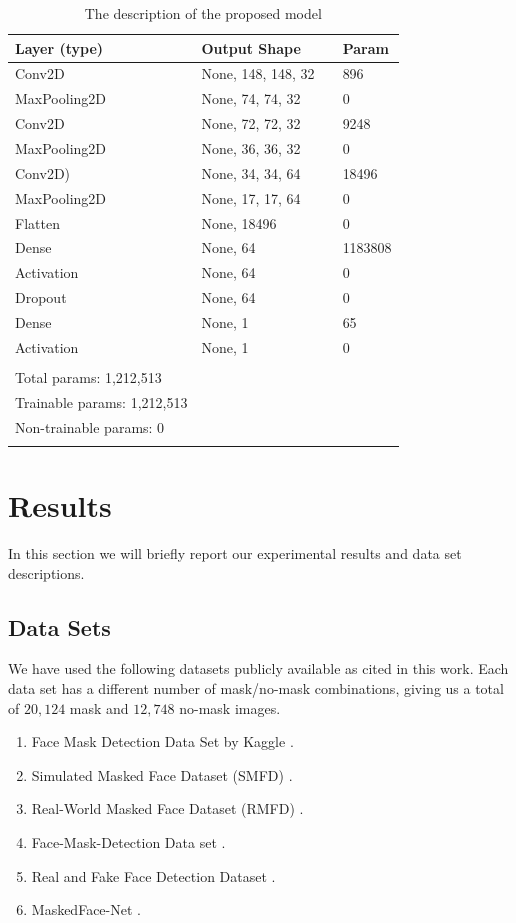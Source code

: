 \documentclass{svproc}
\begin{document}
\begin{table}[]
\centering
\begin{tabular}{llll}
\hline
Layer (type) &  Output Shape & &  Param \\
\hline
Conv2D & None, 148, 148, 32 & & 896 \\
MaxPooling2D & None, 74, 74, 32 & & 0 \\
Conv2D & None, 72, 72, 32 && 9248 \\
MaxPooling2D & None, 36, 36, 32 & & 0 \\
Conv2D) & None, 34, 34, 64 & & 18496 \\
MaxPooling2D & None, 17, 17, 64 & & 0 \\
Flatten & None, 18496 & & 0 \\
Dense & None, 64 & & 1183808 \\
Activation & None, 64 & & 0 \\
Dropout & None, 64 & &  0 \\ 
Dense & None, 1 & &  65 \\
Activation & None, 1 & &  0 \\
\hline \\
Total params: 1,212,513 \\
Trainable params: 1,212,513 \\
Non-trainable params: 0 \\
\hline \\
\end{tabular}
\caption{The description of the proposed model}
\label{modelTable}
\end{table}

\section{Results}

In this section we will briefly report our experimental results and data set descriptions. 

\subsection{Data Sets}
We have used the following datasets publicly available as cited in this work. Each data set has a different number of mask/no-mask combinations, giving us a total of $20,124$ mask and $12,748$ no-mask images.
\begin{enumerate}
  \item Face Mask Detection Data Set by Kaggle \cite{kagglefacemask}. 
  \item Simulated Masked Face Dataset (SMFD) \cite{smfd}.
  \item Real-World Masked Face Dataset (RMFD) \cite{wang2020masked}.
  \item Face-Mask-Detection Data set \cite{chandrikadeb7}.
  \item Real and Fake Face Detection Dataset \cite{realAndFakeFace}.
  \item MaskedFace-Net \cite{learned2016labeled}.
\end{enumerate}
\end{document}
